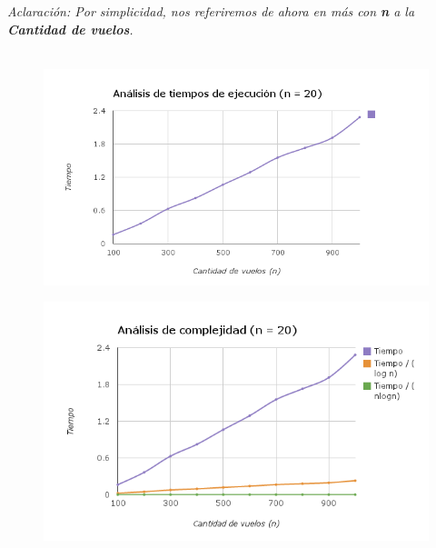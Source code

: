 \documentclass[10pt,a4paper]{article}
\begin{document}
\noindent \textit{Aclaración: Por simplicidad, nos referiremos de ahora en más con \textbf{n} a la \textbf{Cantidad de vuelos}. \\\\
}
	\begin{figure}[h]
		\begin{center}
		   \includegraphics[scale=0.75]{graficos/tiempo_ejecucion20.png}
		\end{center}
	\end{figure}

\newpage
	\begin{figure}[h]
		\begin{center}
		   \includegraphics[scale=0.75]{graficos/complejidad_20.png}
		\end{center}
	\end{figure}
\end{document}
